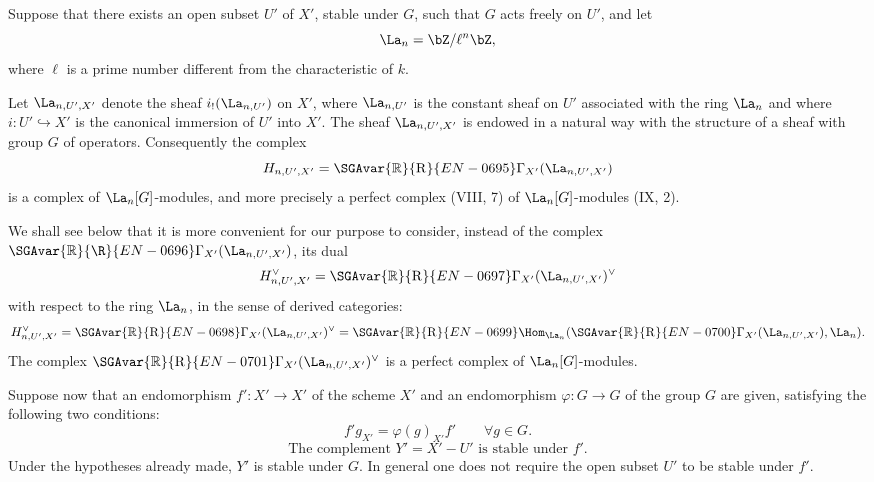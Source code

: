 Suppose that there exists an open subset $U'$ of $X'$, stable under $G$, such that $G$ acts freely on $U'$, and let
\[
\La_n=\bZ/\ell^n\bZ,
\]
where $\ell$ is a prime number different from the characteristic of $k$.

Let $\La_{n,U',X'}$ denote the sheaf $i_!(\La_{n,U'})$ on $X'$, where $\La_{n,U'}$ is the constant sheaf on $U'$ associated with the ring $\La_n$ and where $i:U'\hookrightarrow X'$ is the canonical immersion of $U'$ into $X'$. The sheaf $\La_{n,U',X'}$ is endowed in a natural way with the structure of a sheaf with group $G$ of operators. Consequently the complex
\[
H_{n,U',X'}=\SGAvar{\mathbb{R}}{\mathrm{R}}{EN-0695}\Gamma_{X'}(\La_{n,U',X'})
\]
is a complex of $\La_n[G]$-modules, and more precisely a perfect complex (VIII, 7) of $\La_n[G]$-modules (IX, 2).

We shall see below that it is more convenient for our purpose to consider, instead of the complex $\SGAvar{\mathbb{R}}{\R}{EN-0696}\Gamma_{X'}(\La_{n,U',X'})$, its dual
\[
H_{n,U',X'}^\vee=\SGAvar{\mathbb{R}}{\mathrm{R}}{EN-0697}\Gamma_{X'}(\La_{n,U',X'})^\vee
\]
with respect to the ring $\La_n$, in the sense of derived categories:
\[
H_{n,U',X'}^\vee
=\SGAvar{\mathbb{R}}{\mathrm{R}}{EN-0698}\Gamma_{X'}(\La_{n,U',X'})^\vee
=\SGAvar{\mathbb{R}}{\mathrm{R}}{EN-0699}\Hom_{\La_n}(\SGAvar{\mathbb{R}}{\mathrm{R}}{EN-0700}\Gamma_{X'}(\La_{n,U',X'}),\La_n).
\]
The complex $\SGAvar{\mathbb{R}}{\mathrm{R}}{EN-0701}\Gamma_{X'}(\La_{n,U',X'})^\vee$ is a perfect complex of $\La_n[G]$-modules.

Suppose now that an endomorphism $f':X'\to X'$ of the scheme $X'$ and an endomorphism $\varphi:G\to G$ of the group $G$ are given, satisfying the following two conditions:
\begin{equation}\tag{1.1}
f'g_{X'}=\varphi(g)_{X'}f'\qquad \forall g\in G .
\end{equation}
\begin{equation}\tag{1.2}
\text{The complement }Y'=X'-U'\text{ is stable under }f'.
\end{equation}
Under the hypotheses already made, $Y'$ is stable under $G$. In general one does not require the open subset $U'$ to be stable under $f'$.

